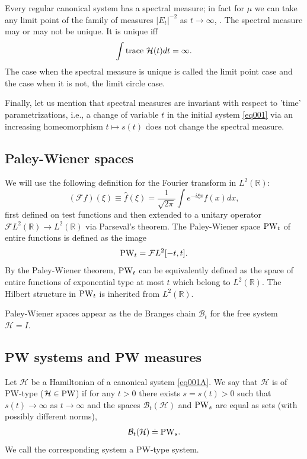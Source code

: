 \documentclass[11pt,twoside,reqno]{amsart}
\def\PW{\text{\rm PW}}
\def\to{\rightarrow}
\def\ms{\bigskip}
\def\ms{\medskip}
\def\R{{\mathbb R}}
\def\BB{{\mathcal B}}
\def\FF{{\mathcal F}}
\def\HH{{\mathcal H}}
\theoremstyle{plain}
\numberwithin{equation}{section}
\begin{document}
Every regular canonical system has a spectral measure; in fact for $\mu$ we can take any limit point of the family of measures $|E_t|^{-2}$ as $t\to \infty$, \cite{dB}. The spectral measure may or may not be unique. It is unique iff
\begin{equation*}\int{\rm trace}\ \HH(t)dt=\infty.\end{equation*}
The case when the spectral measure is unique is called the limit point case and the case when
it is not, the limit circle case.

Finally, let us mention that spectral measures are invariant with respect to  'time' parametrizations, i.e., a  change of variable $t$ in the initial system \eqref{eq001} via an increasing homeomorphism $t\mapsto s(t)$ does not
change the spectral measure.



\ms\subsection{Paley-Wiener spaces}\label{secPW} 


We will use the following
definition for the Fourier transform in $L^2(\R)$:
$$ (\FF f)(\xi)\equiv \hat f(\xi)=\frac1{\sqrt{2\pi}}\int e^{-i\xi x}f(x)dx,$$
first defined on test functions and then extended to a unitary operator
$\FF L^2(\R)\to L^2(\R)$ via Parseval's theorem. The Paley-Wiener space $\PW_t$ of entire functions is defined as the image
$${\rm PW}_t=\FF L^2[-t,t].$$
By the Paley-Wiener theorem, $\PW_t$ can be equivalently defined as
the space of entire functions of exponential type at most $t$ which belong
to $L^2(\R)$. The Hilbert structure in $\PW_t$ is inherited from $L^2(\R)$. 

Paley-Wiener spaces appear as the de Branges chain $\BB_t$ for the free system $\HH=I$.


\ms\subsection{PW systems and PW measures}

Let $\HH$ be a Hamiltonian of a canonical system \eqref{eq001A}. We say that $\HH$ is of PW-type ($\HH\in \PW$)  if for any $t>0$ there exists $s=s(t)>0$ such that $s(t)\to\infty$ as $t\to\infty$ and the spaces $\BB_t(\HH)$ and ${\rm PW}_s$ are equal as sets (with possibly different norms), 
\begin{equation}\BB_t(\HH)\doteq {\rm PW}_s.\label{eq20}\end{equation}
We call the corresponding system a PW-type system.
\end{document}
